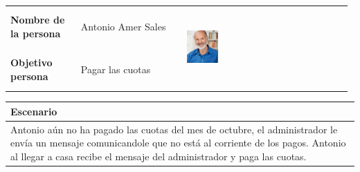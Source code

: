 \documentclass[11pt]{article}
\begin{document}
\begin{table}[H]
  \centering
  \begin{tabular}{p{0.2\linewidth}|p{0.3\linewidth}p{0.475\linewidth}}
    \toprule
    \textbf{Nombre de la persona} & Antonio Amer Sales &\multirow{2}{*}{\begin{minipage}{1.\textwidth}\includegraphics[width=0.2\textwidth, height=30mm]{Antonio}\end{minipage}}\\
    \textbf{Objetivo persona} & Pagar las cuotas & \\
    \bottomrule
  \end{tabular}

\begin{tabular}{p{1.028\linewidth}}
  \textbf{Escenario}\\
  \midrule
  Antonio aún no ha pagado las cuotas del mes de octubre, el administrador le envía un mensaje comunicandole que no está al corriente de los pagos. Antonio al llegar a casa recibe el mensaje del administrador y paga las cuotas.
\end{tabular}

\end{table}
\end{document}
